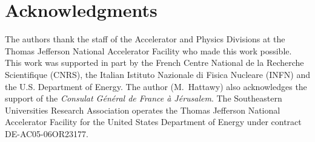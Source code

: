 \section{Acknowledgments}

The authors thank the staff of the Accelerator and Physics Divisions at the 
Thomas Jefferson National Accelerator Facility who made this work 
possible. This work was supported in part by the French Centre National de la 
Recherche Scientifique (CNRS), the Italian Istituto Nazionale di Fisica Nucleare (INFN) 
and the U.S. Department of Energy. The 
author (M.~Hattawy) also acknowledges the support of the {\it Consulat 
G\'en\'eral de France \`a J\'erusalem}. 
The Southeastern Universities Research Association operates the Thomas 
Jefferson National Accelerator Facility for the United States Department of 
Energy under contract DE-AC05-06OR23177.
